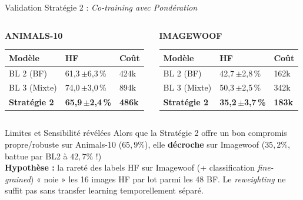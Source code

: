 \documentclass[aspectratio=169, 10pt]{beamer}
\newcommand{\pms}[2]{#1{\tiny\,$\pm$#2}\,\%}
\begin{document}
\begin{frame}{Validation Stratégie 2 : \textit{Co-training avec Pondération}}

  \begin{columns}[T]
    \begin{column}{0.48\textwidth}
      \centering
      \textbf{ANIMALS-10}\\
      \vspace{0.2cm}
      \scriptsize
      \renewcommand{\arraystretch}{1.3}
      \begin{tabular}{@{}lL{1.9cm}C{1.2cm}@{}}
        \toprule
        \color{primary}\textbf{Modèle} & \color{primary}\textbf{HF} & \color{primary}\textbf{Coût} \\
        \midrule
        BL 2 (BF)  & \pms{61,3}{6,3} & 424k \\
        BL 3 (Mixte)        & \pms{74,0}{3,0} & 894k \\
        \textbf{Stratégie 2} & \textbf{\pms{65,9}{2,4}} & \textbf{486k} \\
        \bottomrule
      \end{tabular}
    \end{column}
    \begin{column}{0.48\textwidth}
      \centering
      \textbf{IMAGEWOOF}\\
      \vspace{0.2cm}
      \scriptsize
      \renewcommand{\arraystretch}{1.3}
      \begin{tabular}{@{}lL{1.9cm}C{1.2cm}@{}}
        \toprule
        \color{primary}\textbf{Modèle} & \color{primary}\textbf{HF} & \color{primary}\textbf{Coût} \\
        \midrule
        BL 2 (BF)  & \pms{42,7}{2,8} & 162k \\
        BL 3 (Mixte)        & \pms{50,3}{2,5} & 342k \\
        \textbf{Stratégie 2} & \textbf{\pms{35,2}{3,7}} & \textbf{183k} \\
        \bottomrule
      \end{tabular}
    \end{column}
  \end{columns}

  \vspace{0.5cm}
  \begin{alertblock}{\footnotesize Limites et Sensibilité révélées}
    \footnotesize Alors que la Stratégie 2 offre un bon compromis propre/robuste sur Animals-10 ($65,9\%$), elle \textbf{décroche} sur Imagewoof ($35,2\%$, battue par BL2 à $42,7\%$ !)\\
    \textbf{Hypothèse :} la rareté des labels HF sur Imagewoof (+ classification \textit{fine-grained}) « noie » les 16 images HF par lot parmi les 48 BF. Le \textit{reweighting} ne suffit pas sans transfer learning temporellement séparé.
  \end{alertblock}

\end{frame}
\end{document}
